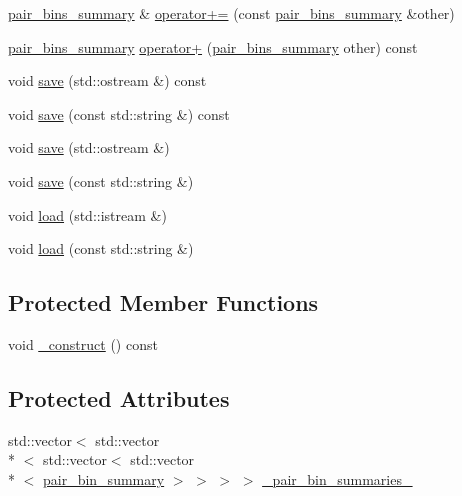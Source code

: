 \begin{DoxyCompactItemize}
\item 
\hyperlink{classIceBRG_1_1pair__bins__summary}{pair\-\_\-bins\-\_\-summary} \& \hyperlink{classIceBRG_1_1pair__bins__summary_a68ecd445cbe2b33b0698188aa0647b24}{operator+=} (const \hyperlink{classIceBRG_1_1pair__bins__summary}{pair\-\_\-bins\-\_\-summary} \&other)
\item 
\hyperlink{classIceBRG_1_1pair__bins__summary}{pair\-\_\-bins\-\_\-summary} \hyperlink{classIceBRG_1_1pair__bins__summary_aa68e04a8182c4eecf874e060dbbffa2c}{operator+} (\hyperlink{classIceBRG_1_1pair__bins__summary}{pair\-\_\-bins\-\_\-summary} other) const 
\item 
void \hyperlink{classIceBRG_1_1pair__bins__summary_a715247f44df3b3aea45ef6f2a9bdd6d7}{save} (std\-::ostream \&) const 
\item 
void \hyperlink{classIceBRG_1_1pair__bins__summary_a17e08424469687b88802862e2175c1e8}{save} (const std\-::string \&) const 
\item 
void \hyperlink{classIceBRG_1_1pair__bins__summary_a987a6e30ce5768bc36c692f424b4d89a}{save} (std\-::ostream \&)
\item 
void \hyperlink{classIceBRG_1_1pair__bins__summary_ae97c13ffd6dbc26905d0b061feef323a}{save} (const std\-::string \&)
\item 
void \hyperlink{classIceBRG_1_1pair__bins__summary_aa1d09ba2a00096bdafa8cd86fd4ce85f}{load} (std\-::istream \&)
\item 
void \hyperlink{classIceBRG_1_1pair__bins__summary_a52231e18dc10d8d5874f910639229332}{load} (const std\-::string \&)
\end{DoxyCompactItemize}
\subsection*{Protected Member Functions}
\begin{DoxyCompactItemize}
\item 
void \hyperlink{classIceBRG_1_1pair__bins__summary_a7fd1953689fbf26462ad42334504b768}{\-\_\-construct} () const 
\end{DoxyCompactItemize}
\subsection*{Protected Attributes}
\begin{DoxyCompactItemize}
\item 
std\-::vector$<$ std\-::vector\\*
$<$ std\-::vector$<$ std\-::vector\\*
$<$ \hyperlink{classIceBRG_1_1pair__bin__summary}{pair\-\_\-bin\-\_\-summary} $>$ $>$ $>$ $>$ \hyperlink{classIceBRG_1_1pair__bins__summary_ae48646da7b9c9cb88fc5987a49152da0}{\-\_\-pair\-\_\-bin\-\_\-summaries\-\_\-}
\end{DoxyCompactItemize}
